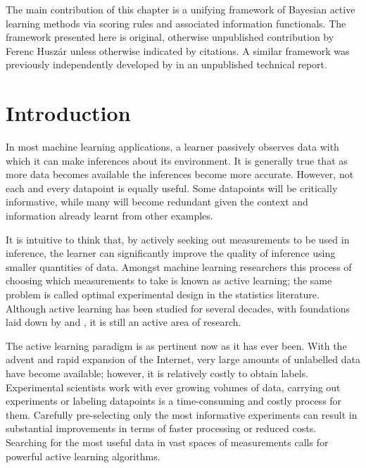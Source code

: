 \begin{summarycontributions}
\cbstart
The main contribution of this chapter is a unifying framework of Bayesian active learning methods via scoring rules and associated information functionals. The framework presented here is original, otherwise unpublished contribution by Ferenc Husz\'{a}r unless otherwise indicated by citations. A similar framework was previously independently developed by \citet{Dawid1994} in an unpublished technical report.
\cbend
\end{summarycontributions}

\section{Introduction}

In most machine learning applications, a learner passively observes data with which it can make inferences about its environment. It is generally true that as more data becomes available the inferences become more accurate. However, not each and every datapoint is equally useful. Some datapoints will be critically informative, while many will become redundant given the context and information already learnt from other examples.

It is intuitive to think that, by actively seeking out measurements to be used in inference, the learner can significantly improve the quality of inference using smaller quantities of data. Amongst machine learning researchers this process of choosing which measurements to take is known as active learning; the same problem is called optimal experimental design in the statistics literature. Although active learning has been studied for several decades, with foundations laid down by \citet{Lindley56} and \citet{jaynes1957}, it is still an active area of research.

The active learning paradigm is as pertinent now as it has ever been. With the advent and rapid expansion of the Internet, very large amounts of unlabelled data have become available; however, it is relatively costly to obtain labels. Experimental scientists work with ever growing volumes of data, carrying out experiments or labeling datapoints is a time-consuming and costly process for them. Carefully pre-selecting only the most informative experiments can result in substantial improvements in terms of faster processing or reduced costs. Searching for the most useful data in vast spaces of measurements calls for powerful active learning algorithms.

